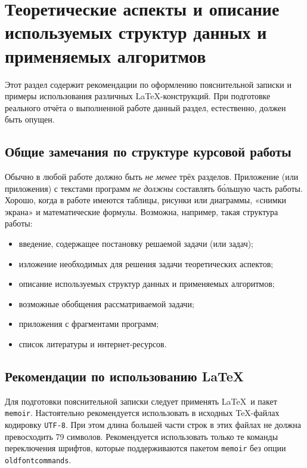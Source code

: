 \section{Теоретические аспекты и описание используемых структур данных и применяемых алгоритмов}

Этот раздел содержит рекомендации по оформлению пояснительной записки
и примеры использования различных \LaTeX-конструкций. При подготовке
реального отчёта о выполненной работе данный раздел, естественно, должен
быть опущен.

\subsection*{Общие замечания по структуре курсовой работы}

Обычно в любой работе должно быть \emph{не менее} трёх разделов. Приложение
(или приложения) с текстами программ \emph{не должны} составлять б\'{о}льшую
часть работы. Хорошо, когда в работе имеются таблицы, рисунки или диаграммы,
«снимки экрана» и математические формулы. Возможна, например, такая
структура работы:

\begin{itemize}
\item введение, содержащее постановку решаемой задачи (или задач);
\item изложение необходимых для решения задачи теоретических аспектов;
\item описание используемых структур данных и применяемых алгоритмов;
\item возможные обобщения рассматриваемой задачи;
\item приложения с фрагментами программ;
\item список литературы и интернет-ресурсов.
\end{itemize}

\subsection*{Рекомендации по использованию \LaTeX}

Для подготовки пояснительной записки следует применять \LaTeX\ и пакет
\texttt{memoir}. Настоятельно рекомендуется использовать в исходных
\TeX-файлах кодировку \texttt{UTF-8}. При этом длина большей части строк в
этих файлах не должна превосходить 79 символов. Рекомендуется
использовать только те команды переключения шрифтов, которые поддерживаются
пакетом \verb|memoir| без опции \verb|oldfontcommands|.

